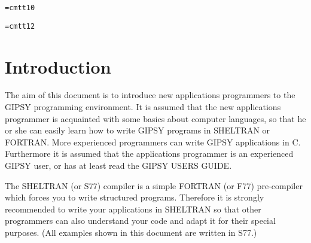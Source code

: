 %
%
%
%
%
%
%
%
\makeindex
\evensidemargin=0cm
\font\tt=cmtt10
\oddsidemargin=0cm
\textwidth=16cm
\textheight=21cm

\pagestyle{heading}
\thispagestyle{empty}
\font\tt=cmtt12
\thispagestyle{empty}
\tableofcontents
\newpage
{}
\chapter{Introduction}

The aim of this document is to introduce new applications programmers to
the GIPSY programming environment.  It is assumed that the new
applications programmer is acquainted with some basics about computer
languages, so that he or she can easily learn how to write GIPSY
programs in SHELTRAN or FORTRAN.  More experienced programmers can write
GIPSY applications in C.  Furthermore it is assumed that the
applications programmer is an experienced GIPSY user, or has at least
read the GIPSY USERS GUIDE.

The SHELTRAN (or S77) compiler is a simple FORTRAN (or F77) pre-compiler
which forces you to write structured programs.  Therefore it is strongly
recommended to write your applications in SHELTRAN so that other
programmers can also understand your code and adapt it for their special
purposes.  (All examples shown in this document are written in S77.)

